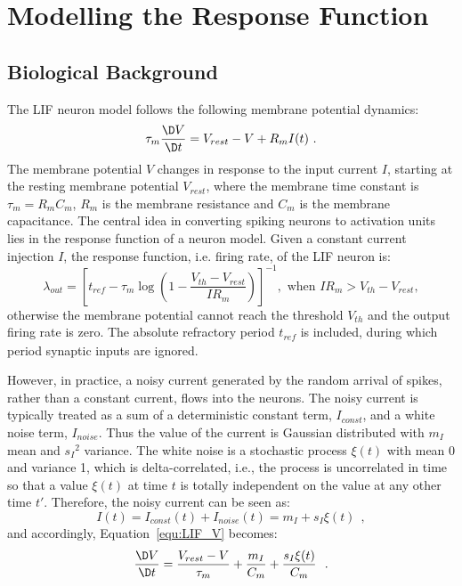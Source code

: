 \section{Modelling the Response Function}
	\label{sec:response_func}
	\subsection{Biological Background}
	\label{sec:siergert}
	The LIF neuron model follows the following membrane potential dynamics:
	\begin{equation}
	\tau_m \frac{\D V}{\D t}=V_{rest} - V + R_{m} I(t) ~.
	\label{equ:LIF_V}
	\end{equation}
	The membrane potential $V$ changes in response to the input current $I$, starting at the resting membrane potential $V_{rest}$, where the membrane time constant is $\tau_m = R_mC_m$, $R_m$ is the membrane resistance and $C_m$ is the membrane capacitance.
	The central idea in converting spiking neurons to activation units lies in the response function of a neuron model.
	Given a constant current injection $I$, the response function, i.e. firing rate, of the LIF neuron is:
	\begin{equation}
	\lambda_\mathit{out}=
	\left [ t_\mathit{ref}-\tau_m\log \left ( 1-\frac{V_{th}-V_\mathit{rest}}{IR_m}  \right )\right ]^{-1}, \textrm{~when~} IR_m>V_{th}-V_{rest},
	\label{equ:consI}
	\end{equation}
	otherwise the membrane potential cannot reach the threshold $V_{th}$ and the output firing rate is zero. 
	The absolute refractory period $t_\mathit{ref}$ is included, during which period synaptic inputs are ignored.
	
	However, in practice, a noisy current generated by the random arrival of spikes, rather than a constant current, flows into the neurons.
	The noisy current is typically treated as a sum of a deterministic constant term, $I_{const}$, and a white noise term, $I_{noise}$.
	Thus the value of the current is Gaussian distributed with $m_I$ mean and ${s_I}^2$ variance.
	The white noise is a stochastic process $\xi(t)$ with mean 0 and variance 1, which is delta-correlated, i.e., the process is uncorrelated in time so that a value $\xi(t)$ at time $t$ is totally independent on the value at any other time $t'$.
	Therefore, the noisy current can be seen as:
	\begin{equation}
	I(t) = I_{const}(t)+I_{noise}(t) = m_I + s_I\xi(t)~~,
	\label{equ:noisyI}
	\end{equation}
	and accordingly, Equation~\ref{equ:LIF_V} becomes:
	\begin{equation}
	\frac{\D V}{\D t}=\frac{V_{rest} - V}{\tau_m } + \frac{m_I}{C_m} + \frac{s_I\xi(t)}{C_m}~~.
	\label{equ:LIF_V2}
	\end{equation}
	
